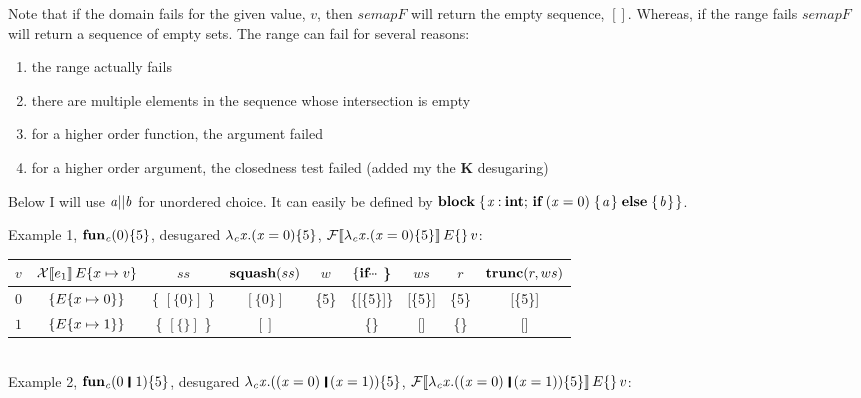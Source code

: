 Note that if the domain fails for the given value, $v$, then $semap{F}{}$ will return the empty sequence, $[]$.
Whereas, if the range fails $semap{F}{}$ will return a sequence of empty sets.
The range can fail for several reasons:
\begin{enumerate}
\item the range actually fails
\item there are multiple elements in the sequence whose intersection is empty
\item for a higher order function, the argument failed
\item for a higher order argument, the closedness test failed (added my the \textbf{K} desugaring)
\end{enumerate}

Below I will use \ensuremath{\Varid{a}||\Varid{b}} for unordered choice.  It can easily be defined by \ensuremath{\textbf{block}\;\{\mskip1.5mu \Varid{x}\mathbin{:}\textbf{int};\,\textbf{if}\;(\Varid{x}\mathrel{=}\mathrm{0})\;\{\mskip1.5mu \Varid{a}\mskip1.5mu\}\;\textbf{else}\;\{\mskip1.5mu \Varid{b}\mskip1.5mu\}\mskip1.5mu\}}.

Example 1, \ensuremath{\textbf{fun}_{\Varid{c}}(\mathrm{0})\{\mathrm{5}\}}, desugared \ensuremath{\lambda_{\Varid{c}}\Varid{x}.(\Varid{x}\mathrel{=}\mathrm{0})\{\mathrm{5}\}}, $\mathcal{F}\llbracket \lambda_{\mathit{c}}\mathit{x}.(\mathit{x}\mathrel{=}\mathrm{0})\{\mathrm{5}\} \rrbracket\, E\{  \} \, v$:

\begin{tabular}{|c|c|c|c|c|c|c|c|c|}
  \hline
  $v$ & $\mathcal{X}\llbracket e_1 \rrbracket\, E\{  x \mapsto v \} $ & \mbox{ $ss$ } & $\textbf{squash}(ss)$ & $w$ & $ \{ \ensuremath{\textbf{if}} \mydots$ \} & $ws$ & $r$ & $\textbf{trunc}(r,ws)$\\
  \hline
  $0$ & $\{ E\{  x \mapsto 0  \} \}$ & \{ $[\{0\}]$ \} & $[\{0\}]$ & \{5\} & \{[\{5\}]\} & [\{5\}] & \{5\} & [\{5\}] \\
  \hline
  $1$ & $\{ E\{  x \mapsto 1  \} \}$ & \{ $[\{\}]$ \} & $[]$ & & \{\} & [] & \{\} & [] \\
  \hline
\end{tabular} \\[4mm]

Example 2, \ensuremath{\textbf{fun}_{\Varid{c}}(\mathrm{0}\hspace{0.19em}\mathop{\rule[-0.1em]{0.15em}{0.75em}}\hspace{0.2em}\mathrm{1})\{\mathrm{5}\}}, desugared \ensuremath{\lambda_{\Varid{c}}\Varid{x}.((\Varid{x}\mathrel{=}\mathrm{0})\hspace{0.19em}\mathop{\rule[-0.1em]{0.15em}{0.75em}}\hspace{0.2em}(\Varid{x}\mathrel{=}\mathrm{1}))\{\mathrm{5}\}}, $\semappp{F}{\ensuremath{\lambda_{\Varid{c}}\Varid{x}.((\Varid{x}\mathrel{=}\mathrm{0})\hspace{0.19em}\mathop{\rule[-0.1em]{0.15em}{0.75em}}\hspace{0.2em}(\Varid{x}\mathrel{=}\mathrm{1}))\{\mathrm{5}\}}}{\myenv{}}{v}$:

